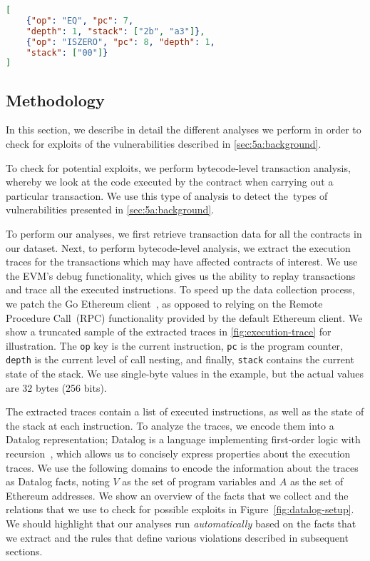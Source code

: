 \begin{lstlisting}[basicstyle=\footnotesize\ttfamily,language=json,float=tb,floatplacement=tb,caption=Sample execution trace information.,label=fig:execution-trace]
[
    {"op": "EQ", "pc": 7, 
    "depth": 1, "stack": ["2b", "a3"]},
    {"op": "ISZERO", "pc": 8, "depth": 1,
    "stack": ["00"]}
]
\end{lstlisting}

\subsection{Methodology}
\label{sec:5a:methodology}

In this section, we describe in detail the different analyses we perform in order to check for exploits of the vulnerabilities described in \autoref{sec:5a:background}.

To check for potential exploits, we perform bytecode-level transaction analysis, whereby we look at the code executed by the contract when carrying out a particular transaction. We use this type of analysis to detect the~\VulnTypes types of vulnerabilities presented in \autoref{sec:5a:background}.

To perform our analyses, we first retrieve transaction data for all the contracts in our dataset. Next, to perform bytecode-level analysis, we extract the execution traces for the transactions which may have affected contracts of interest. We use the EVM's debug functionality, which gives us the ability to replay transactions and trace all the executed instructions. To speed up the data collection process, we patch the Go Ethereum client~\cite{go-ethereum}, as opposed to relying on the Remote Procedure Call~(RPC) functionality provided by the default Ethereum client.
We show a truncated sample of the extracted traces in \autoref{fig:execution-trace} for illustration. 
%
The \lstinline{op} key is the current instruction, \lstinline{pc} is the program counter, \lstinline{depth} is the current level of call nesting, and finally, \lstinline{stack} contains the current state of the stack. We use single-byte values in the example, but the actual values are 32 bytes (256 bits).

The extracted traces contain a list of executed instructions, as well as the state of the stack at each instruction.
To analyze the traces, we encode them into a Datalog representation; Datalog is a language implementing first-order logic with recursion~\cite{Immerman99descriptivecomplexity}, which allows us to concisely express properties about the execution traces.
We use the following domains to encode the information about the traces as Datalog facts, noting $V$ as the set of program variables and $A$ as the set of Ethereum addresses.
We show an overview of the facts that we collect and the relations that we use to check for possible exploits in Figure~\ref{fig:datalog-setup}.
We should highlight that our analyses run \emph{automatically} based on the facts that we extract and the rules that define various violations described in subsequent sections. 

